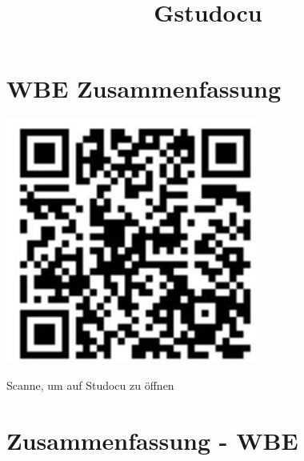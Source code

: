 \documentclass[10pt]{article}
\title{Gstudocu }
\author{}
\date{}
\begin{document}
\maketitle
\section*{WBE Zusammenfassung}
\begin{center}
\includegraphics[max width=\textwidth]{2024_12_29_858f09cde51177c71657g-01}
\end{center}

Scanne, um auf Studocu zu öffnen

\section*{Zusammenfassung - WBE}
\end{document}
